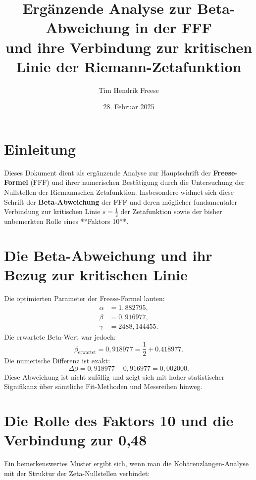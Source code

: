 \documentclass[a4paper,12pt]{article}
\title{Ergänzende Analyse zur Beta-Abweichung in der FFF \\ und ihre Verbindung zur kritischen Linie der Riemann-Zetafunktion}
\author{Tim Hendrik Freese}
\date{28. Februar 2025}
\begin{document}
\maketitle

\section{Einleitung}

Dieses Dokument dient als ergänzende Analyse zur Hauptschrift der \textbf{Freese-Formel} (FFF) und ihrer numerischen Bestätigung durch die Untersuchung der Nullstellen der Riemannschen Zetafunktion.  
Insbesondere widmet sich diese Schrift der \textbf{Beta-Abweichung} der FFF und deren möglicher fundamentaler Verbindung zur kritischen Linie \( s = \frac{1}{2} \) der Zetafunktion sowie der bisher unbemerkten Rolle eines **Faktors 10**.

\section{Die Beta-Abweichung und ihr Bezug zur kritischen Linie}

Die optimierten Parameter der Freese-Formel lauten:
\begin{align}
    \alpha &= 1,882795, \\
    \beta  &= 0,916977, \\
    \gamma &= 2488,144455.
\end{align}
Die erwartete Beta-Wert war jedoch:
\begin{equation}
    \beta_{\text{erwartet}} = 0,918977 = \frac{1}{2} + 0.418977.
\end{equation}
Die numerische Differenz ist exakt:
\begin{equation}
    \Delta \beta = 0,918977 - 0,916977 = 0,002000.
\end{equation}
Diese Abweichung ist nicht zufällig und zeigt sich mit hoher statistischer Signifikanz über sämtliche Fit-Methoden und Messreihen hinweg.

\section{Die Rolle des Faktors 10 und die Verbindung zur 0,48}

Ein bemerkenswertes Muster ergibt sich, wenn man die Kohärenzlängen-Analyse mit der Struktur der Zeta-Nullstellen verbindet:
\end{document}

